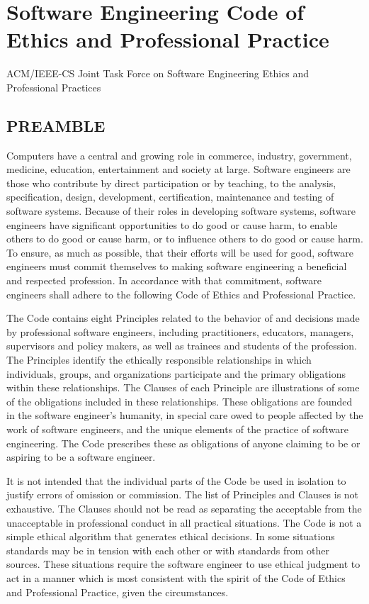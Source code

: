 \chapter{Software Engineering Code of Ethics and Professional
Practice}\label{A:SECode}
\begin{center}
ACM/IEEE-CS Joint Task Force on Software Engineering Ethics and Professional
Practices
\end{center}

\section{PREAMBLE}
Computers have a central and growing role in commerce, industry, government,
medicine, education, entertainment and society at large. Software engineers are
those who contribute by direct participation or by teaching, to the analysis,
specification, design, development, certification, maintenance and testing of
software systems. Because of their roles in developing software systems,
software engineers have significant opportunities to do good or cause harm, to
enable others to do good or cause harm, or to influence others to do good or
cause harm. To ensure, as much as possible, that their efforts will be used for
good, software engineers must commit themselves to making software engineering
a beneficial and respected profession. In accordance with that commitment,
software engineers shall adhere to the following Code of Ethics and
Professional Practice.

The Code contains eight Principles related to the behavior of and decisions
made by professional software engineers, including practitioners, educators,
managers, supervisors and policy makers, as well as trainees and students of
the profession. The Principles identify the ethically responsible relationships
in which individuals, groups, and organizations participate and the primary
obligations within these relationships. The Clauses of each Principle are
illustrations of some of the obligations included in these relationships. These
obligations are founded in the software engineer's humanity, in special care
owed to people affected by the work of software engineers, and the unique
elements of the practice of software engineering. The Code prescribes these as
obligations of anyone claiming to be or aspiring to be a software engineer.    

It is not intended that the individual parts of the Code be used in isolation
to justify errors of omission or commission. The list of Principles and Clauses
is not exhaustive. The Clauses should not be read as separating the acceptable
from the unacceptable in professional conduct in all practical situations. The
Code is not a simple ethical algorithm that generates ethical decisions. In
some situations standards may be in tension with each other or with standards
from other sources. These situations require the software engineer to use
ethical judgment to act in a manner which is most consistent with the spirit of
the Code of Ethics and Professional Practice, given the circumstances.


